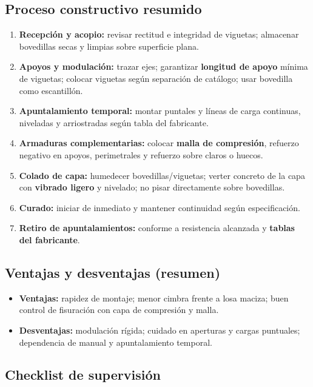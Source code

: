 \documentclass[12pt]{article}
\begin{document}
 \subsection*{Proceso constructivo resumido}
 \begin{enumerate}[leftmargin=*, itemsep=2pt]
 	\item \textbf{Recepción y acopio:} revisar rectitud e integridad de viguetas; almacenar bovedillas secas y limpias sobre superficie plana.
 	\item \textbf{Apoyos y modulación:} trazar ejes; garantizar \textbf{longitud de apoyo} mínima de viguetas; colocar viguetas según separación de catálogo; usar bovedilla como escantillón.
 	\item \textbf{Apuntalamiento temporal:} montar puntales y líneas de carga continuas, niveladas y arriostradas según tabla del fabricante.
 	\item \textbf{Armaduras complementarias:} colocar \textbf{malla de compresión}, refuerzo negativo en apoyos, perimetrales y refuerzo sobre claros o huecos.
 	\item \textbf{Colado de capa:} humedecer bovedillas/viguetas; verter concreto de la capa con \textbf{vibrado ligero} y nivelado; no pisar directamente sobre bovedillas.
 	\item \textbf{Curado:} iniciar de inmediato y mantener continuidad según especificación.
 	\item \textbf{Retiro de apuntalamientos:} conforme a resistencia alcanzada y \textbf{tablas del fabricante}.
 \end{enumerate}
 
 \subsection*{Ventajas y desventajas (resumen)}
 \begin{itemize}[leftmargin=*, itemsep=2pt]
 	\item \textbf{Ventajas:} rapidez de montaje; menor cimbra frente a losa maciza; buen control de fisuración con capa de compresión y malla.
 	\item \textbf{Desventajas:} modulación rígida; cuidado en aperturas y cargas puntuales; dependencia de manual y apuntalamiento temporal.
 \end{itemize}
 
 \subsection{Checklist de supervisión}
 
\end{document}

